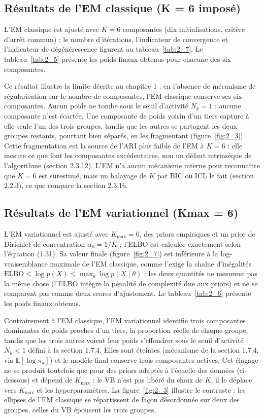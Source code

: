 \subsection{Résultats de l'EM classique (K = 6 imposé)}
L'EM classique est ajusté avec $K=6$ composantes (dix initialisations, critère d'arrêt commun) ; le nombre d'itérations, l'indicateur de convergence et l'indicateur de dégénérescence figurent au tableau~\ref{tab:2_7}. Le tableau~\ref{tab:2_5} présente les poids finaux obtenus pour chacune des six composantes.

Ce résultat illustre la limite décrite au chapitre 1 : en l'absence de mécanisme de régularisation sur le nombre de composantes, l'EM classique conserve ses six composantes. Aucun poids ne tombe sous le seuil d'activité $N_k = 1$ : aucune composante n'est écartée. Une composante de poids voisin d'un tiers capture à elle seule l'un des trois groupes, tandis que les autres se partagent les deux groupes restants, pourtant bien séparés, en les fragmentant (figure~\ref{fig:2_3}). Cette fragmentation est la source de l'ARI plus faible de l'EM à $K=6$ : elle mesure ce que font les composantes excédentaires, non un défaut intrinsèque de l'algorithme (section 2.3.12). L'EM n'a aucun mécanisme interne pour reconnaître que $K=6$ est surestimé, mais un balayage de $K$ par BIC ou ICL le fait (section 2.2.3), ce que compare la section 2.3.16.

\subsection{Résultats de l'EM variationnel (Kmax = 6)}
L'EM variationnel est ajusté avec $K_{\max}=6$, des priors empiriques et un prior de Dirichlet de concentration $\alpha_0 = 1/K$ ; l'ELBO est calculée exactement selon l'équation (1.31). Sa valeur finale (figure~\ref{fig:2_7}) est inférieure à la log-vraisemblance maximale de l'EM classique, comme l'exige la chaîne d'inégalités $\mathrm{ELBO} \leq \log p(X) \leq \max_{\theta} \log p(X \mid \theta)$ : les deux quantités ne mesurent pas la même chose (l'ELBO intègre la pénalité de complexité due aux priors) et ne se comparent pas comme deux scores d'ajustement. Le tableau~\ref{tab:2_6} présente les poids finaux obtenus.

Contrairement à l'EM classique, l'EM variationnel identifie trois composantes dominantes de poids proches d'un tiers, la proportion réelle de chaque groupe, tandis que les trois autres voient leur poids s'effondrer sous le seuil d'activité $N_k < 1$ défini à la section 1.7.4. Elles sont éteintes (mécanisme de la section 1.7.4, via $\mathbb{E}[\log\pi_k]$) et le modèle final conserve trois composantes actives. Cet élagage ne se produit toutefois que pour des priors adaptés à l'échelle des données (ci-dessous) et dépend de $K_{\max}$ : le VB n'est pas libéré du choix de $K$, il le déplace vers $K_{\max}$ et les hyperparamètres. La figure~\ref{fig:2_3} illustre le contraste : les ellipses de l'EM classique se répartissent de façon désordonnée sur deux des groupes, celles du VB épousent les trois groupes.

